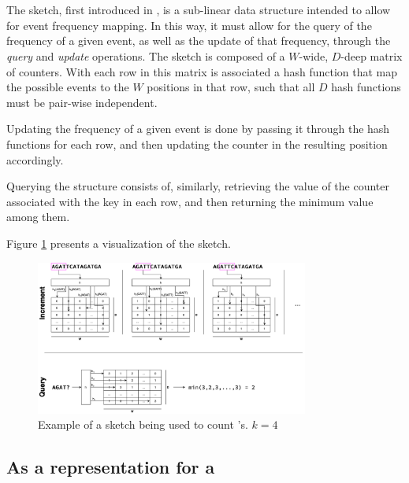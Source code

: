 \section{\cm}
\label{sec:countmin}

The \cm sketch, first introduced in \cite{Cormode2005}, is a sub-linear data structure intended to allow for event frequency mapping.
In this way, it must allow for the query of the frequency of a given event, as well as the update of that frequency, through the
\emph{query} and \emph{update} operations. The sketch is composed of a $W$-wide, $D$-deep matrix of counters. With each row in this
matrix is associated a hash function that map the possible events to the $W$ positions in that row, such that all $D$ hash functions
must be pair-wise independent.

Updating the frequency of a given event is done by passing it through the hash functions for each row, and then updating the counter in
the resulting position accordingly.

Querying the structure consists of, similarly, retrieving the value of the counter associated with the key in each row, and then returning
the minimum value among them.

Figure \ref{fig:countminexample} presents a visualization of the \cm sketch.


\begin{figure}[htbp]
	\begin{center}
    \includegraphics[width=0.8\textwidth]{figures/cm-example}
	\end{center}
	\caption{Example of a \cm sketch being used to count \kmer's. $k=4$}\label{fig:countminexample}
\end{figure}

\subsection{As a representation for a \dBG}

